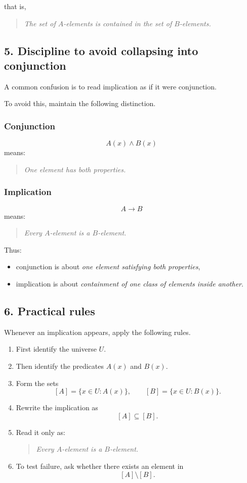 \documentclass{article}
\begin{document}
	\noindent
	that is,
	
	\begin{quote}
		\emph{The set of \(A\)-elements is contained in the set of \(B\)-elements.}
	\end{quote}
	
	\subsection*{5. Discipline to avoid collapsing into conjunction}
	A common confusion is to read implication as if it were conjunction.
	
	To avoid this, maintain the following distinction.
	
	\subsubsection*{Conjunction}
	\[
	A(x)\land B(x)
	\]
	means:
	
	\begin{quote}
		\emph{One element has both properties.}
	\end{quote}
	
	\subsubsection*{Implication}
	\[
	A \to B
	\]
	means:
	
	\begin{quote}
		\emph{Every \(A\)-element is a \(B\)-element.}
	\end{quote}
	
	\noindent
	Thus:
	
	\begin{itemize}
		\item conjunction is about \emph{one element satisfying both properties},
		\item implication is about \emph{containment of one class of elements inside another}.
	\end{itemize}
	
	\subsection*{6. Practical rules}
	Whenever an implication appears, apply the following rules.
	
	\begin{enumerate}
		\item First identify the universe \(U\).
		\item Then identify the predicates \(A(x)\) and \(B(x)\).
		\item Form the sets
		\[
		[A]=\{x\in U:A(x)\},
		\qquad
		[B]=\{x\in U:B(x)\}.
		\]
		\item Rewrite the implication as
		\[
		[A]\subseteq [B].
		\]
		\item Read it only as:
		\begin{quote}
			\emph{Every \(A\)-element is a \(B\)-element.}
		\end{quote}
		\item To test failure, ask whether there exists an element in
		\[
		[A]\setminus [B].
		\]
	\end{enumerate}
	
\end{document}

